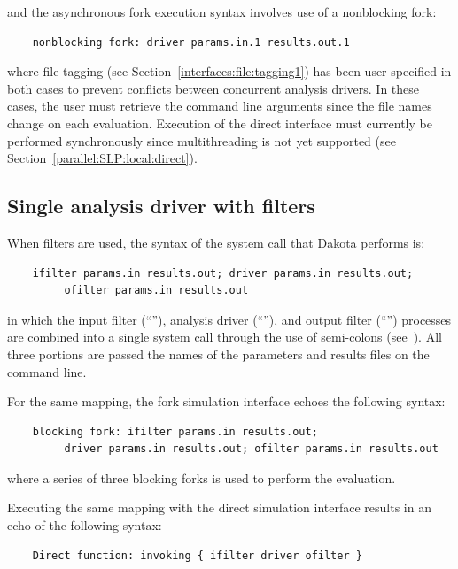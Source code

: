 and the asynchronous fork execution syntax involves use of a
nonblocking fork:
\begin{small}
\begin{verbatim}
    nonblocking fork: driver params.in.1 results.out.1
\end{verbatim}
\end{small}

where file tagging (see Section~\ref{interfaces:file:tagging1}) has
been user-specified in both cases to prevent conflicts between
concurrent analysis drivers. In these cases, the user must retrieve
the command line arguments since the file names change on each
evaluation.  Execution of the direct interface must currently be
performed synchronously since multithreading is not yet supported
(see Section~\ref{parallel:SLP:local:direct}).

\subsection{Single analysis driver with filters}\label{interfaces:components:single2}

When filters are used, the syntax of the system call that Dakota
performs is:
\begin{small}
\begin{verbatim}
    ifilter params.in results.out; driver params.in results.out;
         ofilter params.in results.out
\end{verbatim}
\end{small}

in which the input filter (``''), analysis driver
(``''), and output filter (``'')
processes are combined into a single system call through the use of
semi-colons (see~\cite{And86}). All three portions are
passed the names of the parameters and results files on the command
line.

For the same mapping, the fork simulation interface echoes the
following syntax:
\begin{small}
\begin{verbatim}
    blocking fork: ifilter params.in results.out;
         driver params.in results.out; ofilter params.in results.out
\end{verbatim}
\end{small}

where a series of three blocking forks is used to perform the
evaluation.

Executing the same mapping with the direct simulation interface
results in an echo of the following syntax:
\begin{small}
\begin{verbatim}
    Direct function: invoking { ifilter driver ofilter }
\end{verbatim}
\end{small}

